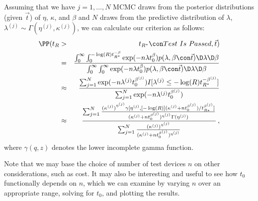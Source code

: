 \documentclass {book}
\begin{document}
Assuming that we have $j = 1, \ldots, N$ MCMC draws from the
posterior distributions (given $\vec{t}$) of $\eta$, $\kappa$, and
$\beta$ and $N$ draws from the predictive distribution of
$\lambda$, $\lambda^{(j)} \sim \Gamma(\eta^{(j)},\kappa^{(j)})$,
we can calculate our criterion as follows:
\begin{eqnarray}\label{ch10:wtc3}
\PP(t_{R} & > & t_{R^*} \con Test\mbox{ } Is\mbox{ }Passed,
\vec{t})\\\nonumber & = & \frac{\int_0^\infty
\int^{-\log(R)t_{R^*}^{-\beta}}_0 \exp(-n\lambda t_0^{\beta})
p(\lambda, \beta \con \vec{t}) \D \lambda \D \beta}{\int_0^\infty
\int_0^\infty \exp(-n\lambda t_0^{\beta}) p(\lambda, \beta \con
\vec{t}) \D \lambda \D \beta}\\\nonumber \mbox{} & \approx &
\frac{\sum_{j=1}^{N} \exp(-n\lambda^{(j)}
t_0^{\beta^{(j)}})I[\lambda^{(j)} \leq
-\log(R)t_{R^*}^{-\beta^{(j)}}]} {\sum_{j=1}^{N}
\exp(-n\lambda^{(j)} t_0^{\beta^{(j)}})}\\\nonumber \mbox{} &
\approx & \frac{\sum^{N}_{j=1} \frac{{(\kappa^{(j)})}^{\eta^{(j)}}
\gamma[\eta^{(j)},[-\log (R)]
(\kappa^{(j)}+nt^{\beta^{(j)}}_{0})/t^{\beta^{(j)}}_{R*}]}{(\kappa^{(j)}+nt^{\beta^{(j)}}_{0})^{\eta^{(j)}}\Gamma(\eta^{(j)})
} }{\sum^{N}_{j=1} \frac{{(\kappa^{(j)})}^{\eta^{(j)}}}
{(\kappa^{(j)}+nt^{\beta^{(j)}}_{0})^{\eta^{(j)}}}}\nonumber \, ,
\end{eqnarray}
where $\gamma(q, z)$ denotes the lower incomplete gamma function.

Note that we may base the choice of number of test devices $n$ on
other considerations, such as cost. It may also be interesting and
useful to see how $t_{0}$ functionally depends on $n$, which we
can examine by varying $n$ over an appropriate range, solving for
$t_{0}$, and plotting the results.
\end{document}
